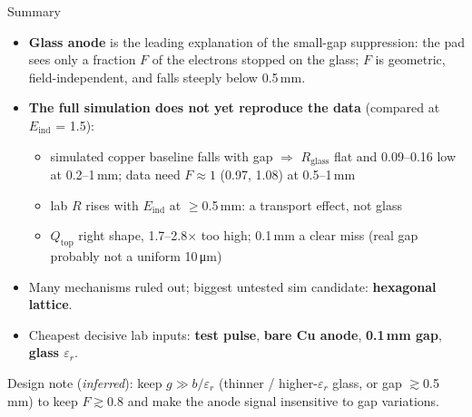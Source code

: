 \documentclass[aspectratio=169,11pt]{beamer}
\newcommand{\bk}[2]{\hyperlink{#1}{\beamergotobutton{#2}}}
\newcommand{\Rglass}{R_\text{glass}}
\newcommand{\Qtop}{Q_\text{top}}
\newcommand{\Eind}{E_\text{ind}}
\newcommand{\er}{\varepsilon_r}
\newcommand{\takeaway}[1]{%
  \vspace{4pt}\colorbox{boxbg}{\parbox{\dimexpr\linewidth-2\fboxsep}{\small #1}}}
\begin{document}
\begin{frame}[label=m-summary]{Summary}
  \begin{itemize}
    \item \textbf{Glass anode} is the leading explanation of the small-gap suppression: the pad sees only a fraction $F$ of the electrons stopped on the glass; $F$ is geometric, field-independent, and falls steeply below 0.5\,mm.
    \item \textbf{The full simulation does not yet reproduce the data} (compared at $\Eind$ = 1.5):
      \begin{itemize}
        \item simulated copper baseline falls with gap $\Rightarrow$ $\Rglass$ flat and 0.09--0.16 low at 0.2--1\,mm; data need $F\approx1$ (0.97, 1.08) at 0.5--1\,mm
        \item lab $R$ rises with $\Eind$ at $\ge$0.5\,mm: a transport effect, not glass
        \item $\Qtop$ right shape, 1.7--2.8$\times$ too high; 0.1\,mm a clear miss (real gap probably not a uniform 10\,\si{\micro m})
      \end{itemize}
    \item Many mechanisms ruled out; biggest untested sim candidate: \textbf{hexagonal lattice}.
    \item Cheapest decisive lab inputs: \textbf{test pulse}, \textbf{bare Cu anode}, \textbf{0.1\,mm gap}, \textbf{glass $\er$}.
  \end{itemize}
  \takeaway{Design note (\emph{inferred}): keep $g \gg b/\er$ (thinner / higher-$\er$ glass, or gap $\gtrsim$0.5\,mm) to keep $F\gtrsim0.8$ and make the anode signal insensitive to gap variations.\ \bk{b-ahead}{B20 looking ahead}}
\end{frame}
\end{document}

